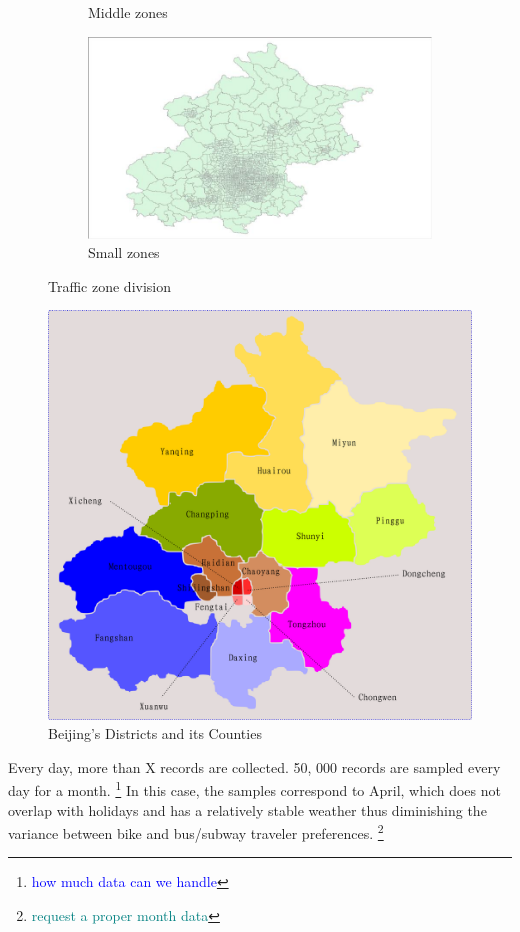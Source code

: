 \documentclass{article}
\newcommand{\domainDoubt}[1]{\footnote{\textcolor{teal}{#1}}}
\newcommand{\technicalDoubt}[1]{\footnote{\textcolor{blue}{#1}}}
\begin{document}
\begin{figure}[H]
\begin{subfigure}[b]{.3\textwidth}
  	\caption{Middle zones}
  \end{subfigure}
  \begin{subfigure}[b]{.3\textwidth}
  	\centering
  	\includegraphics[width=\linewidth]{./images/small_traffic_zone.jpg}
  	\caption{Small zones}
  \end{subfigure}
  \caption{Traffic zone division}
  	\label{fig:data/traffic_zones}
\end{figure}

\begin{figure}
  \centering
  \includegraphics[width=.8\linewidth]{./images/beijing_18areas.png}
  \caption{Beijing's Districts and its Counties}
  \label{fig:data/18areas}
\end{figure}

Every day, more than X records are collected. 50, 000 records are sampled every day for a month. \technicalDoubt{how much data can we handle} In this case, the samples correspond to April, which does not overlap with holidays and has a relatively stable weather thus diminishing the variance between bike and bus/subway traveler preferences. \domainDoubt{request a proper month data}
\end{document}
